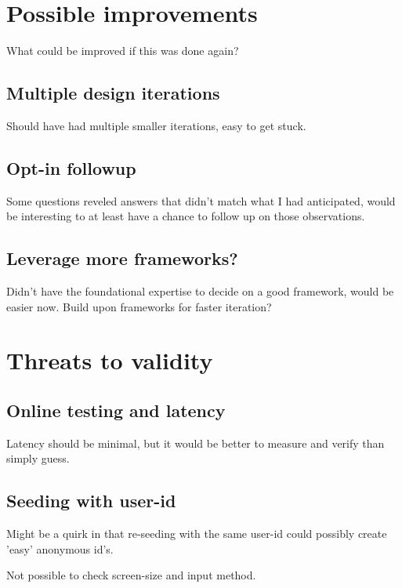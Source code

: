 \section{Possible improvements}

  What could be improved if this was done again?

  \subsection{Multiple design iterations}

    Should have had multiple smaller iterations, easy to get stuck.

  \subsection{Opt-in followup}

    Some questions reveled answers that didn't match what I had
    anticipated, would be interesting to at least have a chance to follow
    up on those observations.

  \subsection{Leverage more frameworks?}

    Didn't have the foundational expertise to decide on a good
    framework, would be easier now.
    Build upon frameworks for faster iteration?

\section{Threats to validity}

  \subsection{Online testing and latency}

  Latency should be minimal, but it would be better to measure and
  verify than simply guess.

  \subsection{Seeding with user-id}

  Might be a quirk in that re-seeding with the same user-id could
  possibly create 'easy' anonymous id's.

  Not possible to check screen-size and input method.

